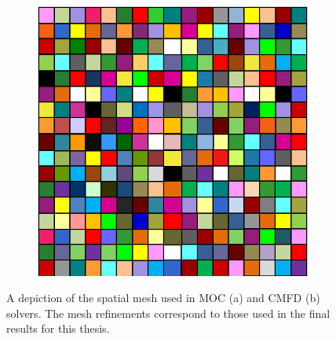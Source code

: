 \begin{figure}[h!]
\begin{subfigure}{0.45\textwidth}
		\includegraphics[width=\linewidth]{figures/cmfd_mesh.PNG}
		\caption{}
		\label{fig:cmfd-mesh-b}
	\end{subfigure}
	\caption[]{A depiction of the spatial mesh used in \ac{MOC} (a) and \ac{CMFD} (b) solvers. The mesh refinements correspond to those used in the final results for this thesis.}
	\label{fig:cmfd-mesh}
\end{figure}

